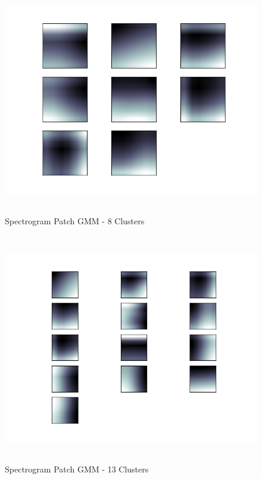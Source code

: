 \documentclass[11pt]{article}
\begin{document}
\begin{figure}[htb]
\centering
\includegraphics[height=10cm]{./spec_patch_clustersGMM8.png}
\caption{\label{fig:spec_patch_clustersGMM8}Spectrogram Patch GMM - 8 Clusters}
\end{figure}

\begin{figure}[htb]
\centering
\includegraphics[height=10cm]{./spec_patch_clustersGMM13.png}
\caption{\label{fig:spec_patch_clustersGMM13}Spectrogram Patch GMM - 13 Clusters}
\end{figure}
\end{document}
